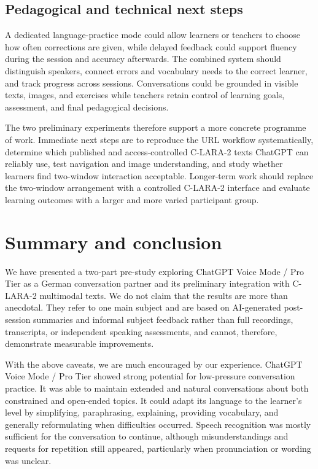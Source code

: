 \documentclass[11pt,a4paper]{article}
\begin{document}
\subsection{Pedagogical and technical next steps}

A dedicated language-practice mode could allow learners or teachers to choose how often corrections are given, while delayed feedback could support fluency during the session and accuracy afterwards. The combined system should distinguish speakers, connect errors and vocabulary needs to the correct learner, and track progress across sessions. Conversations could be grounded in visible texts, images, and exercises while teachers retain control of learning goals, assessment, and final pedagogical decisions.

The two preliminary experiments therefore support a more concrete programme of work. Immediate next steps are to reproduce the URL workflow systematically, determine which published and access-controlled C-LARA-2 texts ChatGPT can reliably use, test navigation and image understanding, and study whether learners find two-window interaction acceptable. Longer-term work should replace the two-window arrangement with a controlled C-LARA-2 interface and evaluate learning outcomes with a larger and more varied participant group.

\section{Summary and conclusion}

We have presented a two-part pre-study exploring ChatGPT Voice Mode / Pro Tier as a German conversation partner and its preliminary integration with C-LARA-2 multimodal texts. We do not claim that the results are more than anecdotal. They refer to one main subject and are based on AI-generated post-session summaries and informal subject feedback rather than full recordings, transcripts, or independent speaking assessments, and cannot, therefore, demonstrate measurable improvements.

With the above caveats, we are much encouraged by our experience. ChatGPT Voice Mode / Pro Tier showed strong potential for low-pressure conversation practice. It was able to maintain extended and natural conversations about both constrained and open-ended topics. It could adapt its language to the learner's level by simplifying, paraphrasing, explaining, providing vocabulary, and generally reformulating when difficulties occurred. Speech recognition was mostly sufficient for the conversation to continue, although misunderstandings and requests for repetition still appeared, particularly when pronunciation or wording was unclear.
\end{document}
